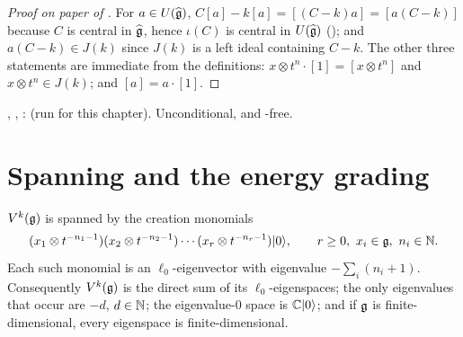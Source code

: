 \begin{proof}[Proof on paper of \allowbreak{}]
For $a\in U(\widehat{\mathfrak{g}})$, $C[a] - k[a] = [(C-k)a] = [a(C-k)]$ because $C$ is central in $\widehat{\mathfrak{g}}$,
hence $\iota(C)$ is central in $U(\widehat{\mathfrak{g}})$ (); and $a(C-k)\in J(k)$ since $J(k)$
is a left ideal containing $C-k$. The other three statements are immediate from the definitions:
$x\otimes t^n\cdot[1] = [x\otimes t^n]$ and $x\otimes t^n\in J(k)$; and $[a] = a\cdot[1]$.
\end{proof}

\begin{status}
\allowbreak{}\allowbreak{}\allowbreak{}\allowbreak{}, \allowbreak{}\allowbreak{}\allowbreak{}\allowbreak{},
\allowbreak{}\allowbreak{}\allowbreak{}:  (run for this
chapter). Unconditional, and -free.
\end{status}

\section{Spanning and the energy grading}\label{l02:sec:grading}

\begin{theorem}\label{l02:thm:span}
$V^k(\mathfrak{g})$ is spanned by the creation monomials
\begin{equation*}
 (x_1\otimes t^{-n_1-1})(x_2\otimes t^{-n_2-1})\cdots(x_r\otimes t^{-n_r-1})|0\rangle,\qquad r\ge0,\ x_i\in\mathfrak{g},\ n_i\in{\mathbb{N}}.
\end{equation*}
Each such monomial is an $\ell_0$-eigenvector with eigenvalue $-\sum_i(n_i+1)$. Consequently
$V^k(\mathfrak{g})$ is the direct sum of its $\ell_0$-eigenspaces; the only eigenvalues that occur are
$-d$, $d\in{\mathbb{N}}$; the eigenvalue-$0$ space is ${\mathbb{C}}|0\rangle$; and if $\mathfrak{g}$ is finite-dimensional, every
eigenspace is finite-dimensional.
\end{theorem}

